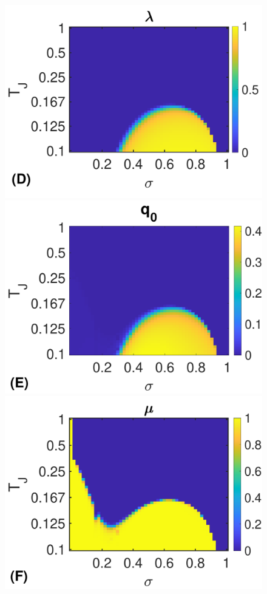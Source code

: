 \documentclass[%
 reprint,
superscriptaddress,
 amsmath,amssymb,
 prl,
]{revtex4-2}
\begin{document}
\begin{figure}
\includegraphics[scale=0.22]{fig2d-eps-converted-to.pdf}
\includegraphics[scale=0.215]{fig2e.pdf}
\includegraphics[scale=0.215]{fig2f-eps-converted-to.pdf}

\end{figure}
\end{document}
